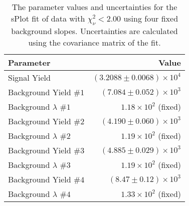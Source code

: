 
\begin{table}[ht]
    \begin{center}
        \begin{tabular}{lr}\toprule
            Parameter & Value \\\midrule
            Signal Yield & $(3.2088 \pm 0.0068) \times 10^{4}$ \\
            Background Yield $\#1$ & $(7.084 \pm 0.052) \times 10^{3}$ \\
            Background $\lambda$ $\#1$ & $1.18 \times 10^{2}$ (fixed) \\
            Background Yield $\#2$ & $(4.190 \pm 0.060) \times 10^{3}$ \\
            Background $\lambda$ $\#2$ & $1.19 \times 10^{2}$ (fixed) \\
            Background Yield $\#3$ & $(4.885 \pm 0.029) \times 10^{3}$ \\
            Background $\lambda$ $\#3$ & $1.19 \times 10^{2}$ (fixed) \\
            Background Yield $\#4$ & $(8.47 \pm 0.12) \times 10^{3}$ \\
            Background $\lambda$ $\#4$ & $1.33 \times 10^{2}$ (fixed) \\\bottomrule
        \end{tabular}
        \caption{The parameter values and uncertainties for the sPlot fit of data with $\chi^2_\nu < 2.00$ using four fixed background slopes. Uncertainties are calculated using the covariance matrix of the fit.}\label{tab:splot-fit-results-chisqdof-2.00-fixed-4}
    \end{center}
\end{table}
